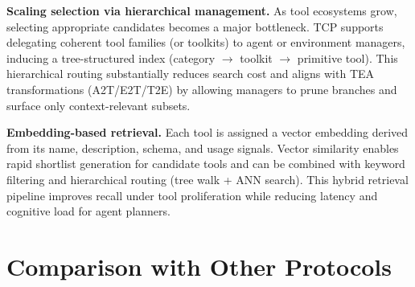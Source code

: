 \documentclass[11pt]{article}
\begin{document}
\textbf{Scaling selection via hierarchical management.}
As tool ecosystems grow, selecting appropriate candidates becomes a major bottleneck. TCP supports delegating coherent tool families (or toolkits) to agent or environment managers, inducing a tree-structured index (category $\rightarrow$ toolkit $\rightarrow$ primitive tool). This hierarchical routing substantially reduces search cost and aligns with TEA transformations (A2T/E2T/T2E) by allowing managers to prune branches and surface only context-relevant subsets.

\textbf{Embedding-based retrieval.}
Each tool is assigned a vector embedding derived from its name, description, schema, and usage signals. Vector similarity enables rapid shortlist generation for candidate tools and can be combined with keyword filtering and hierarchical routing (tree walk + ANN search). This hybrid retrieval pipeline improves recall under tool proliferation while reducing latency and cognitive load for agent planners.

\section{Comparison with Other Protocols}
\label{appx_sec:comparison_with_other_protocols}
\end{document}
